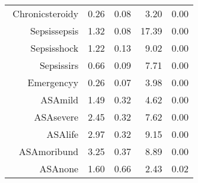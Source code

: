 \begin{tabular}{rrrrr}
$$  Chronic\-steroid\-y & 0.26 & 0.08 & 3.20 & 0.00 \\ 
  Sepsis\-sepsis & 1.32 & 0.08 & 17.39 & 0.00 \\ 
  Sepsis\-shock & 1.22 & 0.13 & 9.02 & 0.00 \\ 
  Sepsis\-sirs & 0.66 & 0.09 & 7.71 & 0.00 \\ 
  Emergency\-y & 0.26 & 0.07 & 3.98 & 0.00 \\ 
  ASA\-mild & 1.49 & 0.32 & 4.62 & 0.00 \\ 
  ASA\-severe & 2.45 & 0.32 & 7.62 & 0.00 \\ 
  ASA\-life & 2.97 & 0.32 & 9.15 & 0.00 \\ 
  ASA\-moribund & 3.25 & 0.37 & 8.89 & 0.00 \\ 
  ASA\-none & 1.60 & 0.66 & 2.43 & 0.02 \\ 
   \hline
\end{tabular}

